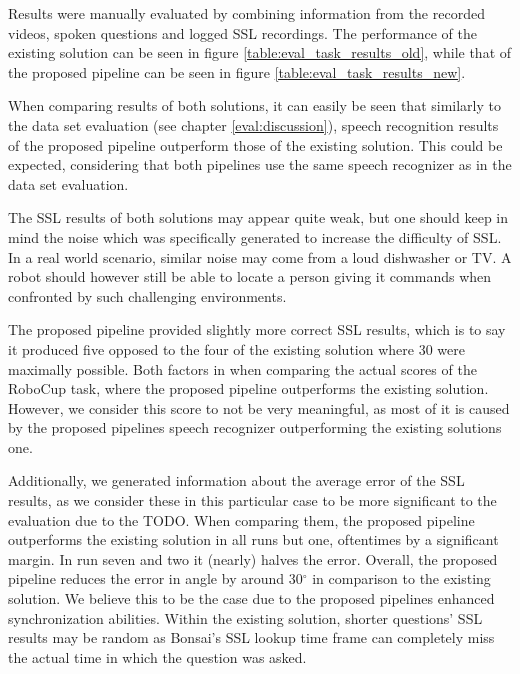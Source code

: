 Results were manually evaluated by combining information from the recorded videos, spoken questions and logged SSL recordings.
The performance of the existing solution can be seen in figure \ref{table:eval_task_results_old}, while that of the proposed pipeline can be seen in figure \ref{table:eval_task_results_new}.

When comparing results of both solutions, it can easily be seen that similarly to the data set evaluation (see chapter \ref{eval:discussion}), speech recognition results of the proposed pipeline outperform those of the existing solution.
This could be expected, considering that both pipelines use the same speech recognizer as in the data set evaluation.

The SSL results of both solutions may appear quite weak, but one should keep in mind the noise which was specifically generated to increase the difficulty of SSL.
In a real world scenario, similar noise may come from a loud dishwasher or TV.
A robot should however still be able to locate a person giving it commands when confronted by such challenging environments.

The proposed pipeline provided slightly more correct SSL results, which is to say it produced five opposed to the four of the existing solution where 30 were maximally possible.
Both factors in when comparing the actual scores of the RoboCup task, where the proposed pipeline outperforms the existing solution.
However, we consider this score to not be very meaningful, as most of it is caused by the proposed pipelines speech recognizer outperforming the existing solutions one.

Additionally, we generated information about the average error of the SSL results, as we consider these in this particular case to be more significant to the evaluation due to the TODO.
When comparing them, the proposed pipeline outperforms the existing solution in all runs but one, oftentimes by a significant margin.
In run seven and two it (nearly) halves the error.
Overall, the proposed pipeline reduces the error in angle by around 30$^\circ$ in comparison to the existing solution.
We believe this to be the case due to the proposed pipelines enhanced synchronization abilities.
Within the existing solution, shorter questions' SSL results may be random as Bonsai's SSL lookup time frame can completely miss the actual time in which the question was asked.

